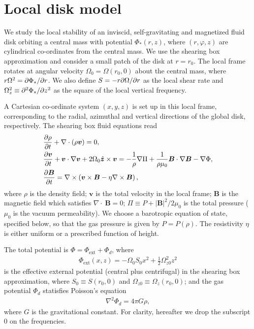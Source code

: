 \section{Local disk model}
We study the local stability of an inviscid, self-gravitating and
magnetized fluid disk orbiting a central mass with
potential $\Phi_*(r,z)$, where $(r,\varphi,z)$ are cylindrical
co-ordinates from the central mass. We use the shearing box approximation     
\citep{goldreich65b} and consider a small patch of the disk at
$r=r_0$. The local frame rotates at angular velocity 
$\Omega_0=\Omega(r_0,0)$ about the central mass, where $r\Omega^2 =
\partial\Phi_*/\partial r$. We also define $S=-r\partial\Omega/\partial r$ as the local shear
rate and $\Omega_z^2\equiv\partial^2\Phi_*/\partial z^2$ as the square of the
local vertical frequency. 

A Cartesian co-ordinate system $(x,y,z)$ is set
up in this local frame, corresponding to the radial, azimuthal and vertical
directions of the global disk, respectively. The shearing box fluid
equations read 
\begin{align} 
  &\frac{\partial\rho}{\partial t}+\nabla\cdot(\rho\bm{v}) = 0,\\
  &\frac{\partial \bm{v}}{\partial t} + \bm{v}\cdot\nabla\bm{v} +
  2\Omega_0\hat{\bm{z}}\times\bm{v} = - \frac{1}{\rho}\nabla\Pi +
  \frac{1}{\rho\mu_0}\bm{B}\cdot\nabla\bm{B}
  -\nabla\Phi,\\
  &\frac{\partial\bm{B}}{\partial t}= \nabla\times\left(\bm{v}\times\bm{B} -
  \eta\nabla\times\bm{B}\right), 
\end{align}
where $\rho$ is the density field; $\bm{v}$ is the total velocity in
the local frame; $\bm{B}$ is the magnetic field which satisfies
$\nabla\cdot~\bm{B}=0$; $\Pi \equiv P +
|\bm{B}|^2/2\mu_0$ is the total pressure ($\mu_0$ is the vacuum
permeability). We choose a barotropic equation of state, specified
below, so that the gas pressure is given by $P=P(\rho)$. The
resistivity $\eta$ is either uniform or a prescribed function of
height. 


The total potential is $\Phi = \Phi_\mathrm{ext} + \Phi_d$, where
\begin{align}
  \Phi_\mathrm{ext}(x,z) = -\Omega_0 S_0 x^2 +
  \frac{1}{2}\Omega_{z0}^2z^2 
\end{align}
is the effective external potential (central plus centrifugal) in the
shearing box approximation, where $S_0\equiv S(r_0,0)$ and
$\Omega_{z0}\equiv\Omega_z(r_0,0)$; 
and the gas potential $\Phi_d$ statisfies Poisson's equation
\begin{align}
  \nabla^2\Phi_d = 4\pi G \rho, 
\end{align}
where $G$ is the gravitational constant. For clarity, hereafter we
drop the subscript $0$ on the frequencies. 

